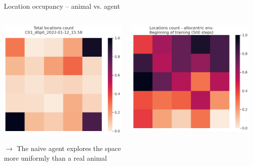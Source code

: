 \documentclass[bigger]{beamer}
\begin{document}
\begin{frame}[label={sec:orga5015db}]{Location occupancy -- animal vs. agent}
\begin{columns}
\begin{column}{0.5\columnwidth}
\begin{center}
\includegraphics[height=0.43\textheight]{img/C01_d0p0_2022-01-12_15.58_locations_count.png}
\end{center}
\(\to\) The naive agent explores the space more uniformly than a real animal
\end{column}
\begin{column}{0.5\columnwidth}
\begin{center}
\includegraphics[height=0.4\textheight]{img/q-learning_allo_locations_count_500steps_all_cues.png}

\end{center}
\end{column}
\end{columns}
\end{frame}
\end{document}
